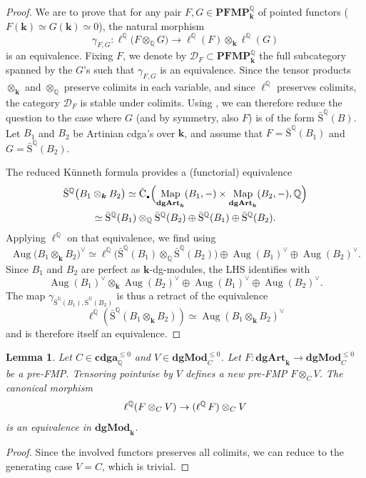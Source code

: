 \documentclass[JEP,XML,SOM,Unicode,NoEqCountersInSection]{cedram}
\let\mathcal\mathscr
\let\autoref\Cref
\let\widebar\bar
\newcommand{\sbullet}{{\scriptscriptstyle\bullet}}
\newtheorem{lem}[thm]{Lemma}
\theoremstyle{definition}
\newcommand{\Q}{\mathbb{Q}}
\newcommand{\dual}[1]{{#1}^{\vee}}
\newcommand{\Dd}{\mathcal{D}}
\newcommand{\cdgaunbounded}{\mathbf{cdga}}
\newcommand{\cdga}{\cdgaunbounded^{\leq 0}}
\newcommand{\dgArt}{\mathbf{dgArt}}
\newcommand{\dgMod}{\mathbf{dgMod}}
\DeclareMathOperator{\Map}{Map}
\let\originalleft\left
\let\originalright\right
\renewcommand{\left}{\mathopen{}\mathclose\bgroup\originalleft}
\renewcommand{\right}{\aftergroup\egroup\originalright}
\newcommand{\Aug}{\operatorname{Aug}}
\renewcommand{\k}{{\boldsymbol{k}}}
\newcommand{\ellQ}{\operatorname{\ell^\Q}}
\newcommand{\SQb}{\operatorname{{\bar S}^\Q}}
\newcommand{\PFMP}{\mathbf{PFMP}}
\begin{document}
\begin{proof}
We are to prove that for any pair $F, G \in \PFMP_\k^\Q$ of pointed functors (\ie $F(\k) \simeq G(\k) \simeq 0$), the natural morphism
\[
\gamma_{F,G} \colon \ellQ \bigl( F \otimes_\Q G \bigr) \to \ellQ(F) \otimes_\k \ellQ(G)
\]
is an equivalence. Fixing $F$, we denote by $\Dd_F \subset \PFMP_\k^\Q$ the full subcategory spanned by the $G$'s such that $\gamma_{F,G}$ is an equivalence.
Since the tensor products $\otimes_\k$ and $\otimes_\Q$ preserve colimits in each variable, and since $\ellQ$ preserves colimits, the category $\Dd_F$ is stable under colimits.
Using \autoref{lem:generateurs}, we can therefore reduce the question to the case where $G$ (and by symmetry, also $F$) is of the form $\SQb(B)$.
Let $B_1$ and $B_2$ be Artinian cdga's over $\k$, and assume that $F = \SQb(B_1)$ and $G = \SQb(B_2)$.

The reduced Künneth formula provides a (functorial) equivalence
\begin{multline*}
\SQb\bigl(B_1 \otimes_\k B_2\bigr) \simeq \widebar{\mathrm{C}}_\sbullet \Bigl( \Map_{\dgArt_\k}(B_1,-) \times \Map_{\dgArt_\k}(B_2,-), \Q \Bigr) \\
\simeq \SQb(B_1) \otimes_\Q \SQb(B_2) \oplus \SQb(B_1) \oplus \SQb(B_2).
\end{multline*}
Applying $\ellQ$ on that equivalence, we find using \autoref{lem:tgtSQ}
\[
\dual{\Aug\bigl(B_1 \otimes_\k B_2\bigr)} \simeq \ellQ\bigl(\SQb(B_1) \otimes_\Q \SQb(B_2) \bigr) \oplus \dual{\Aug(B_1)} \oplus \dual{\Aug(B_2)}.
\]
Since $B_1$ and $B_2$ are perfect as $\k$-dg-modules, the LHS identifies with
\[
\dual{\Aug(B_1)} \otimes_\k \dual{\Aug(B_2)} \oplus \dual{\Aug(B_1)} \oplus \dual{\Aug(B_2)}.
\]
The map $\gamma_{\SQb(B_1), \SQb(B_2)}$ is thus a retract of the equivalence
\[
\ellQ(\SQb(B_1 \otimes_\k B_2)) \simeq \dual{\Aug(B_1 \otimes_\k B_2)}
\]
and is therefore itself an equivalence.
\end{proof}
\begin{lem}\label{lem:Cactionell}
Let $C \in \cdga_\Q$ and $V \in \dgMod_C^{\leq 0}$. Let $F \colon \dgArt_\k \to \dgMod_C^{\leq 0}$ be a pre-FMP. Tensoring pointwise by $V$ defines a new pre-FMP $F \otimes_C V$. The canonical morphism
\[
\ellQ\left(F \otimes_C V\right) \to (\ellQ F) \otimes_C V
\]
is an equivalence in $\dgMod_\k$.
\end{lem}

\begin{proof}
Since the involved functors preserves all colimits, we can reduce to the generating case $V = C$, which is trivial.
\end{proof}
\end{document}
